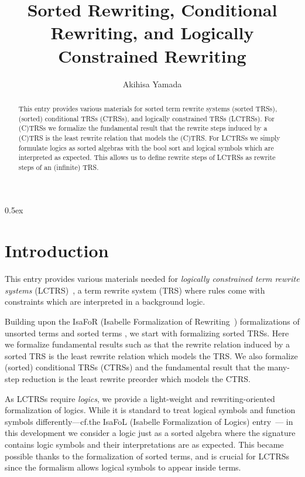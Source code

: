 \documentclass[11pt,a4paper]{article}
\begin{document}
\title{Sorted Rewriting, Conditional Rewriting, and Logically Constrained Rewriting}
\author{Akihisa Yamada}

\maketitle

\begin{abstract}
This entry provides various materials for sorted term rewrite systems (sorted TRSs),
(sorted) conditional TRSs (CTRSs),
and
logically constrained TRSs (LCTRSs).
For (C)TRSs we formalize
the fundamental result that the rewrite steps induced by a (C)TRS is the least rewrite relation that models the (C)TRS.
For LCTRSs we simply formulate logics as sorted algebras with the bool sort and logical symbols which are interpreted as expected.
This allows us to define rewrite steps of LCTRSs as rewrite steps of an (infinite) TRS.
\end{abstract}

\tableofcontents

\parindent 0pt\parskip 0.5ex

\section{Introduction}

This entry provides various materials needed for
\emph{logically constrained term rewrite systems} (LCTRS)~\cite{KopN13},
a term rewrite system (TRS) where rules come with constraints
which are interpreted in a background logic.

Building upon the IsaFoR (Isabelle Formalization of Rewriting~\cite{ThiemannS09})
formalizations of unsorted terms \cite{First_Order_Terms-AFP}
and sorted terms \cite{Sorted_Terms-AFP},
we start with formalizing sorted TRSs.
Here we formalize fundamental results such as that the rewrite relation induced by a sorted TRS is the least rewrite relation which models the TRS.
We also formalize (sorted) conditional TRSs (CTRSs) and the fundamental result that
the many-step reduction is the least rewrite preorder which models the CTRS.

As LCTRSs require \emph{logics}, we provide a light-weight and rewriting-oriented formalization of logics.
While it is standard to treat logical symbols and function symbols differently---cf.\@ the IsaFoL (Isabelle Formalization of Logics) entry~\cite{Abstract_Completeness-AFP}---%
in this development we consider a logic just as a sorted algebra where the signature contains logic symbols
and their interpretations are as expected.
This became possible thanks to the formalization of sorted terms, and
is crucial for LCTRSs since the formalism allows logical symbols to appear inside terms.
\end{document}
